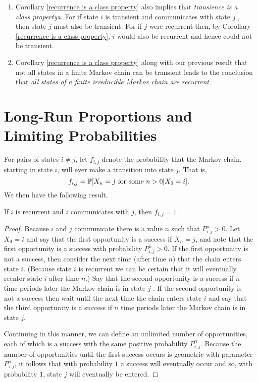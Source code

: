 \begin{remark}
    \begin{enumerate}
        \item Corollary \ref{recurrence is a class property} also implies that \textit{transience is a class propertya}. For if state $i$ is transient and communicates with state $j$ , then state $j$ must also be transient. For if $j$ were recurrent then, by Corollary \ref{recurrence is a class property}, $i$ would also be recurrent and hence could not be transient.
        \item Corollary \ref{recurrence is a class property} along with our previous result that not all states in a finite Markov chain can be transient leads to the conclusion that \textit{all states of a finite irreducible Markov chain are recurrent.}
    \end{enumerate}
\end{remark}

\section{Long-Run Proportions and Limiting Probabilities}

For pairs of states $i \neq j$, let $f_{i, j}$ denote the probability that the Markov chain, starting in state $i$, will ever make a transition into state $j$. That is,
$$
f_{i,j} = \mathbb{P} [X_n = j \text{ for some } n > 0 | X_0 = i].
$$
We then have the following result.
\begin{proposition}\label{Recurrence & Communication}
    If $i$ is recurrent and $i$ communicates with $j$, then $f_{i,j} = 1$
    .
    \begin{proof}
        Because $i$ and $j$ communicate there is a value $n$ such that $P_{i,j}^n > 0$. Let $X_0 = i$ and say that the first opportunity is a success if $X_n = j$, and note that the first opportunity is a success with probability $P^n_{i,j} > 0$. If the first opportunity is not a success, then consider the next time (after time $n$) that the chain enters state $i$. (Because state $i$ is recurrent we can be certain that it will eventually reenter state $i$ after time $n$.) Say that the second opportunity is a success if $n$ time periods later the Markov chain is in state $j$ . If the second opportunity is not a success then wait until the next time the chain enters state $i$ and say that the third opportunity is a success if $n$ time periods later the Markov chain is in state $j$.
        
        Continuing in this manner, we can define an unlimited number of opportunities, each of which is a success with the same positive probability $P^n_{i,j}$. Because the number of opportunities until the first success occurs is geometric with parameter $P^n_{i,j}$, it follows that with probability $1$ a success will eventually occur and so, with probability $1$, state $j$ will eventually be entered.
    \end{proof}
\end{proposition}

